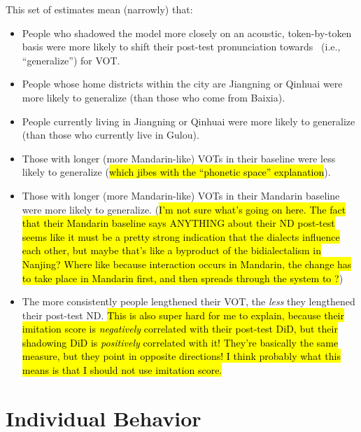 This set of estimates mean (narrowly) that:
\begin{itemize}
    \item People who shadowed the model more closely on an acoustic, token-by-token basis were more likely to shift their post-test pronunciation towards \annie~(i.e., ``generalize'') for VOT.
    \item People whose home districts within the city are Jiangning or Qinhuai were more likely to generalize (than those who come from Baixia).
    \item People currently living in Jiangning or Qinhuai were more likely to generalize (than those who currently live in Gulou).
    \item Those with longer (more Mandarin-like) VOTs in their \ND{} baseline were less likely to generalize (\hl{which jibes with the ``phonetic space'' explanation}).
    \item Those with longer (more Mandarin-like) VOTs in their Mandarin baseline were more likely to generalize. (\hl{I'm not sure what's going on here. The fact that their Mandarin baseline says ANYTHING about their ND post-test seems like it must be a pretty strong indication that the dialects influence each other, but maybe that's like a byproduct of the bidialectalism in Nanjing? Where like because interaction occurs in Mandarin, the change has to take place in Mandarin first, and then spreads through the system to \ND{}?}) %
    \item The more consistently people lengthened their VOT, the \textit{less} they lengthened their post-test ND. \hl{This is also super hard for me to explain, because their imitation score is \textit{negatively} correlated with their post-test DiD, but their shadowing DiD is \textit{positively} correlated with it! They're basically the same measure, but they point in opposite directions! I think probably what this means is that I should not use imitation score.}%
\end{itemize}

\section{Individual Behavior}
\label{sec:expint:individual}
